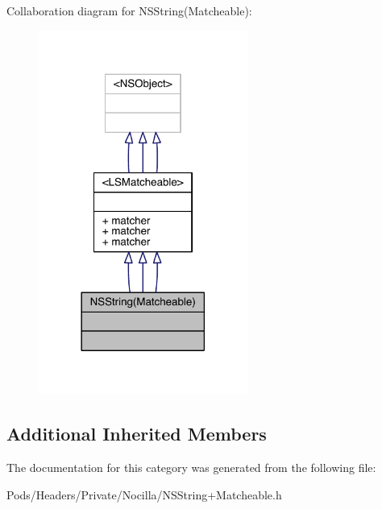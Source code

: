 Collaboration diagram for N\-S\-String(Matcheable)\-:\nopagebreak
\begin{figure}[H]
\begin{center}
\leavevmode
\includegraphics[width=194pt]{category_n_s_string_07_matcheable_08__coll__graph}
\end{center}
\end{figure}
\subsection*{Additional Inherited Members}


The documentation for this category was generated from the following file\-:\begin{DoxyCompactItemize}
\item 
Pods/\-Headers/\-Private/\-Nocilla/N\-S\-String+\-Matcheable.\-h\end{DoxyCompactItemize}
